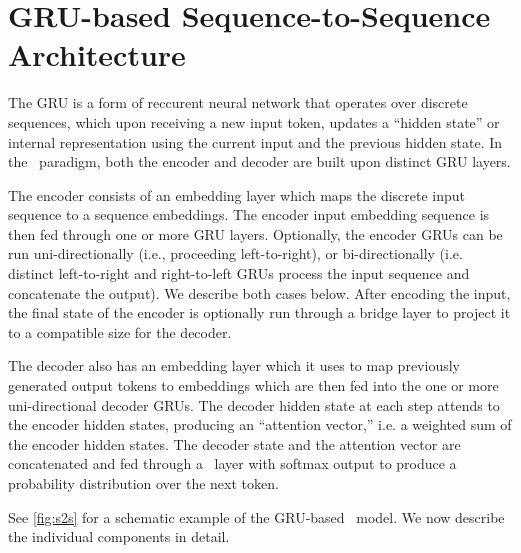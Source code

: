 \chapter{GRU-based Sequence-to-Sequence Architecture}
\label{sec:nlggru}



The GRU is a form of reccurent neural network \citep{elman1990} that operates
over discrete sequences, which upon receiving a new input token, updates a
``hidden state'' or internal representation using the current input and the
previous hidden state. In the \sequencetosequence~paradigm, both the encoder
and decoder are built upon distinct GRU layers. 

The encoder consists of an embedding layer which maps the discrete input
sequence to a sequence embeddings. The encoder input embedding sequence is
then fed through one or more GRU layers. Optionally, the encoder GRUs can be
run uni-directionally (i.e., proceeding left-to-right), or bi-directionally
(i.e. distinct left-to-right and right-to-left GRUs process the input sequence
and concatenate the output). We describe both cases below. After encoding the
input, the final state of the encoder is optionally run through a bridge layer
to project it to a compatible size for the decoder. 

The decoder also has an embedding layer which it uses to map previously
generated output tokens to embeddings which are then fed into the one or more
uni-directional decoder GRUs. The decoder hidden state at each step attends to
the encoder hidden states, producing an ``attention vector,'' i.e. a weighted
sum of the encoder hidden states. The decoder state and the attention vector
are concatenated and fed through a \feedforward~layer with softmax output to
produce a probability distribution over the next token. 

See \autoref{fig:s2s} for a schematic example of the GRU-based
\sequencetosequence~model. We now describe the individual components in
detail.

